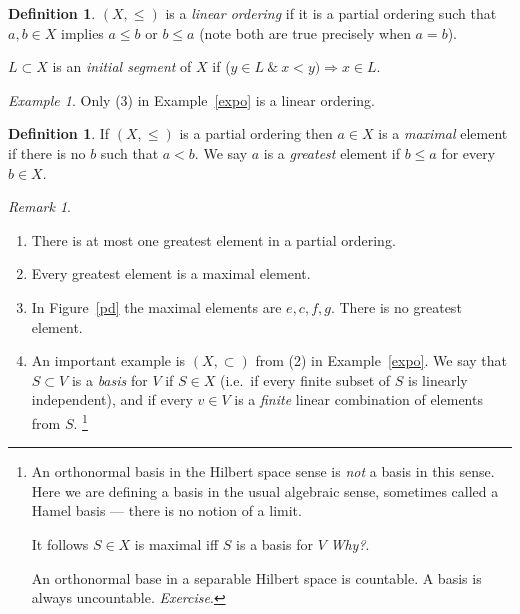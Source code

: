\documentclass[a4paper]{amsart}
\theoremstyle{plain}
\theoremstyle{definition}
\newtheorem{definition}[theorem]{Definition}%
\theoremstyle{remark}
\newtheorem{example}[theorem]{Example}
\newtheorem{remark}[theorem]{Remark}
\begin{document}
  
\begin{definition}
$ (X,\leqslant ) $ is a \emph{linear ordering} if it is a partial ordering such that
$ a,b \in X  $ implies $ a \leqslant b $ or $ b  \leqslant a $ (note both are true precisely when $ a=b $).

%
 $ L \subset X $ is an \emph{initial segment} of $ X $ if ($ y\in L\ \&\ x < y) \Longrightarrow  x \in L $. 

 \end{definition}
 
\begin{example} Only (3) in Example~\ref{expo} is a linear ordering.
\end{example} 
 
  
\begin{definition}
If $ (X,\leqslant )$ is a  partial ordering then $a  \in X $ is a \emph{maximal} element if there is no $ b $ such that $ a < b $. We say $ a $ is a \emph{greatest} element if $ b \leqslant a $ for every $ b \in X$.   
\end{definition}


\begin{remark}\mbox{}

\begin{enumerate}
\item There is at most one greatest element in a partial ordering.  
\item Every greatest element is a maximal element.
\item  In Figure~\ref{pd} the maximal elements are $e,c,f,g $.  There is no greatest element. 
\item An important example is $ (X, \subset ) $ from (2) in Example~\ref{expo}.
We say that $ S \subset V $ is a \emph{basis} for $ V $ if $ S \in X $ (i.e.\  if every finite subset of $ S $ is   linearly independent), and if every $ v\in V $ is a \emph{finite} linear combination of elements from $ S $.%
\footnote{An orthonormal basis in the Hilbert space sense is \emph{not} a basis in this sense.  Here we are defining a basis in the usual algebraic sense, sometimes called a Hamel basis --- there is no notion of a limit.

It follows $ S \in X $ is maximal iff $ S $ is a basis for $ V $ \emph{Why?}.

An orthonormal base in a separable Hilbert space is countable.  A basis is always uncountable. \emph{Exercise}.}
\end{enumerate}
\end{remark}
  
\end{document}
